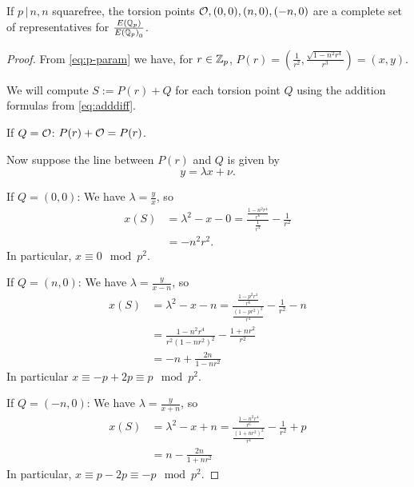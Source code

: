 \documentclass[12pt, a4paper]{amsart}
\begin{document}
\begin{thm}
  If $p \, | \, n, n$ squarefree, the torsion points ${\mathcal O}, (0,0), (n,0), (-n,0)$
  are a complete set of representatives for $\frac{{E({\mathbb Q}_p)}}{{E({\mathbb Q}_p)}_0}$.
\end{thm}
\begin{proof}
  From \autoref{eq:p-param} we have, for $r \in {\mathbb Z}_p$,
  $P(r) = (\frac{1}{r^2}, \frac{\sqrt{1-n^2r^4}}{r^3}) = (x,y)$.

  We will compute $S := P(r) + Q$ for each torsion point $Q$ using
  the addition formulas from \autoref{eq:adddiff}.
   
  If $Q = {\mathcal O}$: $P(r) + {\mathcal O} = P(r)$.

  Now suppose the line between $P(r)$ and $Q$ is given by
  \[y = \lambda x + \nu.\]
    
  If $Q = (0,0)$:
  We have $\lambda = \frac{y}{x}$, so
  \begin{equation*}
    \begin{split}
      x(S)
      &= \lambda^2 - x - 0 =
      \frac{\frac{1 - n^2r^4}{r^6}}{\frac{1}{r^4}} - \frac{1}{r^2} \\
      &= -n^2r^2.
    \end{split}
  \end{equation*}
  In particular, $x \equiv 0 \mod{p^2}.$
  \newline
  
  If $Q = (n, 0)$: We have $\lambda = \frac{y}{x-n}$, so
  \begin{equation*}
    \begin{split}
      x(S)
      &= \lambda^2 - x - n = 
      \frac{\frac{1 - p^2r^4}{r^6}}{\frac{(1-pr^2)^2}{r^4}} -
      \frac{1}{r^2} - n \\
      &= \frac{1-n^2r^4}{r^2(1-nr^2)^2} - \frac{1+nr^2}{r^2} \\
      &= -n + \frac{2n}{1-nr^2}
    \end{split}
  \end{equation*}
  In particular $x \equiv -p + 2p \equiv p \mod{p^2}.$
  \newline
  
  If $Q = (-n, 0)$: We have $\lambda = \frac{y}{x+n}$, so
  \begin{equation*}
    \begin{split}
      x(S)
      &= \lambda^2 - x + n = 
      \frac{\frac{1 - n^2r^4}{r^6}}{\frac{(1+nr^2)^2}{r^4}} -
      \frac{1}{r^2} + p \\
      &= n - \frac{2n}{1+nr^2}
    \end{split}
  \end{equation*}
  In particular, $x \equiv p-2p \equiv -p \mod{p^2}$.


\end{proof}
\end{document}
